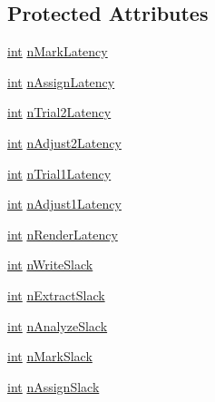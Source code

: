 \subsection*{Protected Attributes}
\begin{DoxyCompactItemize}
\item 
\hyperlink{xmltok_8h_a5a0d4a5641ce434f1d23533f2b2e6653}{int} \hyperlink{class__sbsms___1_1_sub_band_aa9855aac2f7afcc30c28b5653ffb87ba}{n\+Mark\+Latency}
\item 
\hyperlink{xmltok_8h_a5a0d4a5641ce434f1d23533f2b2e6653}{int} \hyperlink{class__sbsms___1_1_sub_band_af83ae8c6a5374d33d95fc90dc922f049}{n\+Assign\+Latency}
\item 
\hyperlink{xmltok_8h_a5a0d4a5641ce434f1d23533f2b2e6653}{int} \hyperlink{class__sbsms___1_1_sub_band_aff3a79aeee5305de3c29e7816d9efd68}{n\+Trial2\+Latency}
\item 
\hyperlink{xmltok_8h_a5a0d4a5641ce434f1d23533f2b2e6653}{int} \hyperlink{class__sbsms___1_1_sub_band_a8284b65159a237d4f9d88847b2f763ad}{n\+Adjust2\+Latency}
\item 
\hyperlink{xmltok_8h_a5a0d4a5641ce434f1d23533f2b2e6653}{int} \hyperlink{class__sbsms___1_1_sub_band_aeceb990dbd2ecce998eeaaaf5f7a3b93}{n\+Trial1\+Latency}
\item 
\hyperlink{xmltok_8h_a5a0d4a5641ce434f1d23533f2b2e6653}{int} \hyperlink{class__sbsms___1_1_sub_band_aa05755663636b7fed71050364fce0a86}{n\+Adjust1\+Latency}
\item 
\hyperlink{xmltok_8h_a5a0d4a5641ce434f1d23533f2b2e6653}{int} \hyperlink{class__sbsms___1_1_sub_band_a4ff511a6d2cf6129253101fb61abea81}{n\+Render\+Latency}
\item 
\hyperlink{xmltok_8h_a5a0d4a5641ce434f1d23533f2b2e6653}{int} \hyperlink{class__sbsms___1_1_sub_band_ad1ad7fa03e0865d091f93422ea24d952}{n\+Write\+Slack}
\item 
\hyperlink{xmltok_8h_a5a0d4a5641ce434f1d23533f2b2e6653}{int} \hyperlink{class__sbsms___1_1_sub_band_aa717eaac6adc81277581ae7b4734a12a}{n\+Extract\+Slack}
\item 
\hyperlink{xmltok_8h_a5a0d4a5641ce434f1d23533f2b2e6653}{int} \hyperlink{class__sbsms___1_1_sub_band_adcdab052bb14ed3bde10fc905b9ab6d4}{n\+Analyze\+Slack}
\item 
\hyperlink{xmltok_8h_a5a0d4a5641ce434f1d23533f2b2e6653}{int} \hyperlink{class__sbsms___1_1_sub_band_ae80c41544f0f5eec5af0db4b98fd57e1}{n\+Mark\+Slack}
\item 
\hyperlink{xmltok_8h_a5a0d4a5641ce434f1d23533f2b2e6653}{int} \hyperlink{class__sbsms___1_1_sub_band_a4d2db2fca1e55b4b349dbafe4e333ae8}{n\+Assign\+Slack}

\end{DoxyCompactItemize}
